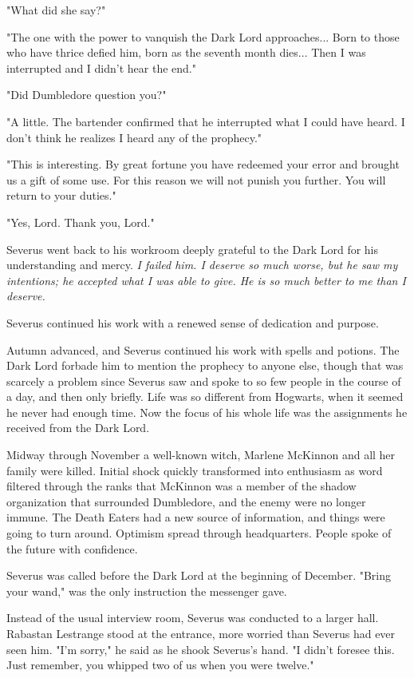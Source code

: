"What did she say?"

"The one with the power to vanquish the Dark Lord approaches... Born to those who have thrice defied him, born as the seventh month dies... Then I was interrupted and I didn't hear the end."

"Did Dumbledore question you?"

"A little. The bartender confirmed that he interrupted what I could have heard. I don't think he realizes I heard any of the prophecy."

"This is interesting. By great fortune you have redeemed your error and brought us a gift of some use. For this reason we will not punish you further. You will return to your duties."

"Yes, Lord. Thank you, Lord."

Severus went back to his workroom deeply grateful to the Dark Lord for his understanding and mercy. \emph{I failed him. I deserve so much worse, but he saw my intentions; he accepted what I was able to give. He is so much better to me than I deserve.}

Severus continued his work with a renewed sense of dedication and purpose.

Autumn advanced, and Severus continued his work with spells and potions. The Dark Lord forbade him to mention the prophecy to anyone else, though that was scarcely a problem since Severus saw and spoke to so few people in the course of a day, and then only briefly. Life was so different from Hogwarts, when it seemed he never had enough time. Now the focus of his whole life was the assignments he received from the Dark Lord.

Midway through November a well-known witch, Marlene McKinnon and all her family were killed. Initial shock quickly transformed into enthusiasm as word filtered through the ranks that McKinnon was a member of the shadow organization that surrounded Dumbledore, and the enemy were no longer immune. The Death Eaters had a new source of information, and things were going to turn around. Optimism spread through headquarters. People spoke of the future with confidence.

Severus was called before the Dark Lord at the beginning of December. "Bring your wand," was the only instruction the messenger gave.

Instead of the usual interview room, Severus was conducted to a larger hall. Rabastan Lestrange stood at the entrance, more worried than Severus had ever seen him. "I'm sorry," he said as he shook Severus's hand. "I didn't foresee this. Just remember, you whipped two of us when you were twelve."

